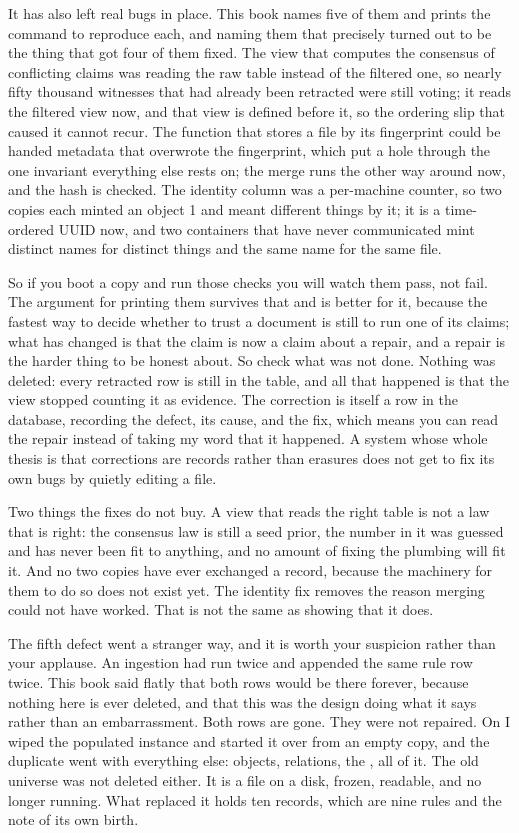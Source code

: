 It has also left real bugs in place. This book names five of them and prints the command to reproduce each, and naming them that precisely turned out to be the thing that got four of them fixed. The view that computes the consensus of conflicting claims was reading the raw table instead of the filtered one, so nearly fifty thousand witnesses that had already been retracted were still voting; it reads the filtered view now, and that view is defined before it, so the ordering slip that caused it cannot recur. The function that stores a file by its fingerprint could be handed metadata that overwrote the fingerprint, which put a hole through the one invariant everything else rests on; the merge runs the other way around now, and the hash is checked. The identity column was a per-machine counter, so two copies each minted an object 1 and meant different things by it; it is a time-ordered UUID now, and two containers that have never communicated mint distinct names for distinct things and the same name for the same file.

So if you boot a copy and run those checks you will watch them pass, not fail. The argument for printing them survives that and is better for it, because the fastest way to decide whether to trust a document is still to run one of its claims; what has changed is that the claim is now a claim about a repair, and a repair is the harder thing to be honest about. So check what was not done. Nothing was deleted: every retracted row is still in the table, and all that happened is that the view stopped counting it as evidence. The correction is itself a row in the database, recording the defect, its cause, and the fix, which means you can read the repair instead of taking my word that it happened. A system whose whole thesis is that corrections are records rather than erasures does not get to fix its own bugs by quietly editing a file.

Two things the fixes do not buy. A view that reads the right table is not a law that is right: the consensus law is still a seed prior, the number in it was guessed and has never been fit to anything, and no amount of fixing the plumbing will fit it. And no two copies have ever exchanged a record, because the machinery for them to do so does not exist yet. The identity fix removes the reason merging could not have worked. That is not the same as showing that it does.

The fifth defect went a stranger way, and it is worth your suspicion rather than your applause. An ingestion had run twice and appended the same rule row twice. This book said flatly that both rows would be there forever, because nothing here is ever deleted, and that this was the design doing what it says rather than an embarrassment. Both rows are gone. They were not repaired. On \labLineageWipeDate{} I wiped the populated instance and started it over from an empty copy, and the duplicate went with everything else: \labLineageObjects{} objects, \labLineageRelations{} relations, the \labLineageScale{}, all of it. The old universe was not deleted either. It is a \labLineageSize{} file on a disk, frozen, readable, and no longer running. What replaced it holds ten records, which are nine rules and the note of its own birth.

